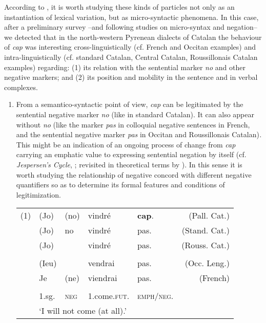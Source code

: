 \documentclass[output=paper]{LSP/langsci}
\begin{document}
According to \citet{rigau_mirative_2012}, it is worth studying these kinds of particles not only as an instantiation of lexical variation, but as micro-syntactic phenomena. In this case, after a preliminary survey –and following \citet{cornips_field_2007} studies on micro-syntax and negation– we detected that in the north-western Pyrenean dialects of Catalan the behaviour of \textit{cap} was interesting cross-linguistically (cf. French and Occitan examples) and intra-linguistically (cf. standard Catalan, Central Catalan, Roussillonais Catalan examples) regarding: (1) its relation with the sentential marker \textit{no} and other negative markers; and (2) its position and mobility in the sentence and in verbal complexes. 

\begin{enumerate}
\item From a semantico-syntactic point of view, \textit{cap} can be legitimated by the sentential negative marker \textit{no }(like in standard Catalan). It can also appear without \textit{no }(like the marker \textit{pas }in colloquial negative sentences in French, and the sentential negative marker \textit{pas }in Occitan and Roussillonais Catalan)\textit{. }This might be an indication of an ongoing process of change from \textit{cap }carrying an emphatic value to expressing sentential negation by itself (cf. \textit{Jespersen’s Cycle}, \citealt{jespersen_negation_1917}; revisited in theoretical terms by \citealt{roberts_diachronic_2007,schwenter_fine_2006}). In this sense it is worth studying the relationship of negative concord with different negative quantifiers so as to determine its formal features and conditions of legitimization.

\begin{tabular}{lllllr}
(1) 
& {(Jo)} & (no) & vindré & \textbf{cap}. & {(Pall. Cat.)}\\
& {(Jo)} & no   & vindré & pas. & {(Stand. Cat.)}\\
& {(Jo)} &      & vindré & pas. & {(Rouss. Cat.)}\\
& & & & & \\
& {(Ieu)}&      & vendrai & pas. & {(Occ. Leng.)}\\
& {Je}   &{(ne)}& viendrai & pas. & {(French)}\\
& & & & & \\
&{1.sg.} & \textsc{neg} & 1.come.\textsc{fut}. & {\textsc{emph}/\textsc{neg}}. & \\
& \multicolumn{5}{l}{‘I will not come (at all).’}\\
\end{tabular}


\end{enumerate}
\end{document}
